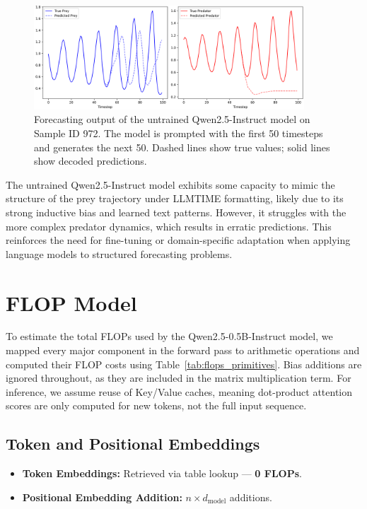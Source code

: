 \documentclass[a4paper,12pt]{article}
\begin{document}
 
  \begin{figure}[h]
      \centering
      \includegraphics[width=0.9\textwidth]{sample972_untrained.png}
      \caption{Forecasting output of the untrained Qwen2.5-Instruct model on Sample ID 972. The model is prompted with the first 50 timesteps and generates the next 50. Dashed lines show true values; solid lines show decoded predictions.}
      \label{fig:sample972_untrained}
  \end{figure}
  
  The untrained Qwen2.5-Instruct model exhibits some capacity to mimic the structure of the prey trajectory under LLMTIME formatting, likely due to its strong inductive bias and learned text patterns. However, it struggles with the more complex predator dynamics, which results in erratic predictions. This reinforces the need for fine-tuning or domain-specific adaptation when applying language models to structured forecasting problems.
  
  \section{FLOP Model}

To estimate the total FLOPs used by the Qwen2.5-0.5B-Instruct model, we mapped every major component in the forward pass to arithmetic operations and computed their FLOP costs using Table~\ref{tab:flops_primitives}. Bias additions are ignored throughout, as they are included in the matrix multiplication term. For inference, we assume reuse of Key/Value caches, meaning dot-product attention scores are only computed for new tokens, not the full input sequence.

\subsection*{Token and Positional Embeddings}
\begin{itemize}
  \item \textbf{Token Embeddings:} Retrieved via table lookup — \textbf{0 FLOPs}.
  \item \textbf{Positional Embedding Addition:} $n \times d_{\text{model}}$ additions.
\end{itemize}
\end{document}
